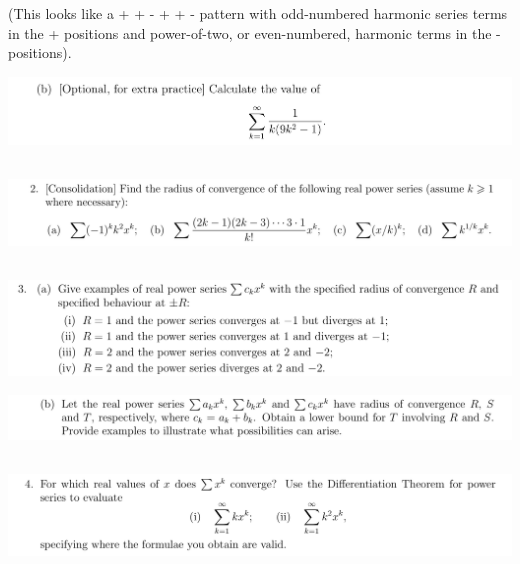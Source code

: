 \documentclass[12pt]{article}
\begin{document}
(This looks like a + + - + + - pattern with odd-numbered harmonic series terms in the + positions
and power-of-two, or even-numbered, harmonic terms in the - positions).


\begin{mdframed}
\includegraphics[width=400pt]{img/analysis--oxford-M2-I-7-1-b.png}
\end{mdframed}

\newpage
\subsection{}
\begin{mdframed}
\includegraphics[width=400pt]{img/analysis--oxford-M2-I-7-2.png}
\end{mdframed}

\newpage
\subsection{}
\begin{mdframed}
\includegraphics[width=400pt]{img/analysis--oxford-M2-I-7-3-a.png}
\end{mdframed}

\begin{mdframed}
\includegraphics[width=400pt]{img/analysis--oxford-M2-I-7-3-b.png}
\end{mdframed}

\newpage
\subsection{}
\begin{mdframed}
\includegraphics[width=400pt]{img/analysis--oxford-M2-I-7-4.png}
\end{mdframed}
\end{document}

